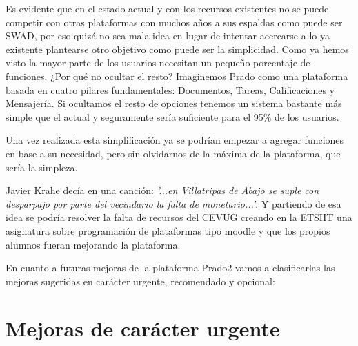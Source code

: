 \bigskip
Es evidente que en el estado actual y con los recursos existentes no se puede competir con otras plataformas con muchos años a sus espaldas como puede ser SWAD, por eso quizá no sea mala idea en lugar de intentar acercarse a lo ya existente plantearse otro objetivo como puede ser la simplicidad. Como ya hemos visto la mayor parte de los usuarios necesitan un pequeño porcentaje de funciones. ¿Por qué no ocultar el resto? Imaginemos Prado como una plataforma basada en cuatro pilares fundamentales: Documentos, Tareas, Calificaciones y Mensajería. Si ocultamos el resto de opciones tenemos un sistema bastante más simple que el actual y seguramente sería suficiente para el 95\% de los usuarios.

\bigskip
Una vez realizada esta simplificación ya se podrían empezar a agregar funciones en base a su necesidad, pero sin olvidarnos de la máxima de la plataforma, que sería la simpleza. 

\bigskip
Javier Krahe decía en una canción: \textit{'...en Villatripas de Abajo se suple con desparpajo por parte del vecindario la falta de monetario...'}. Y partiendo de esa idea se podría resolver la falta de recursos del CEVUG creando en la ETSIIT una asignatura sobre programación de plataformas tipo moodle y que los propios alumnos fueran mejorando la plataforma. 

\newpage
En cuanto a futuras mejoras de la plataforma Prado2 vamos a clasificarlas las mejoras sugeridas en carácter urgente, recomendado y opcional:

\section{Mejoras de carácter urgente}

